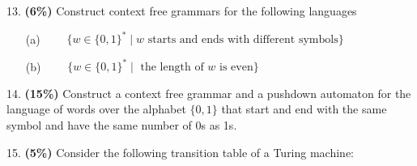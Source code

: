 \documentclass[11pt]{article}
\begin{document}
\medskip
\noindent
%
13. {\bf (6\%)} Construct context free grammars for the following languages
%
\begin{itemize}
 \item[(a)] {$\qquad \{ w \in \{0,1\}^* \mid w \text{ starts and ends with different symbols}\}$}
 \begin{itemize}
    \item[] {
  }
\end{itemize}
 \item[(b)] {$\qquad  \{ w \in \{0,1\}^* \mid \text{ the length of $w$ is even}\}$}
  \begin{itemize}
    \item[] {
  }
\end{itemize}
\end{itemize}





\medskip
\noindent
%
14. {\bf (15\%)} Construct a context free grammar and a pushdown automaton for the  language of words over the alphabet $\{0,1\}$ that start and end with the same symbol and have the same number of 0s as 1s.
 \begin{itemize}
    \item[] {
  }
\end{itemize}


\bigskip
\noindent
%
15. {\bf (5\%)} Consider the following transition table of a Turing
machine:
\end{document}
